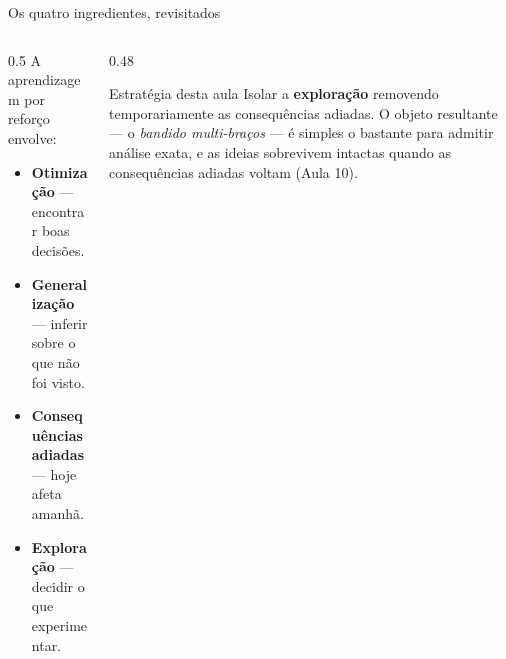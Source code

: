 \documentclass[aspectratio=169, 10pt]{beamer}
\begin{document}
\begin{frame}{Os quatro ingredientes, revisitados}
  \begin{columns}[T]
    \begin{column}{0.5\textwidth}
      A aprendizagem por reforço envolve:
      \begin{itemize}
        \item \textbf{Otimização} — encontrar boas decisões.
        \item \textbf{Generalização} — inferir sobre o que não foi visto.
        \item \textbf{Consequências adiadas} — hoje afeta amanhã.
        \item \alert{\textbf{Exploração}} — decidir o que experimentar.
      \end{itemize}
    \end{column}
    \begin{column}{0.48\textwidth}
      \begin{defbox}{Estratégia desta aula}
        Isolar a \textbf{exploração} removendo temporariamente as
        consequências adiadas. O objeto resultante — o \emph{bandido
        multi-braços} — é simples o bastante para admitir análise exata,
        e as ideias sobrevivem intactas quando as consequências adiadas
        voltam (Aula 10).
      \end{defbox}
    \end{column}
  \end{columns}
\end{frame}
\end{document}

